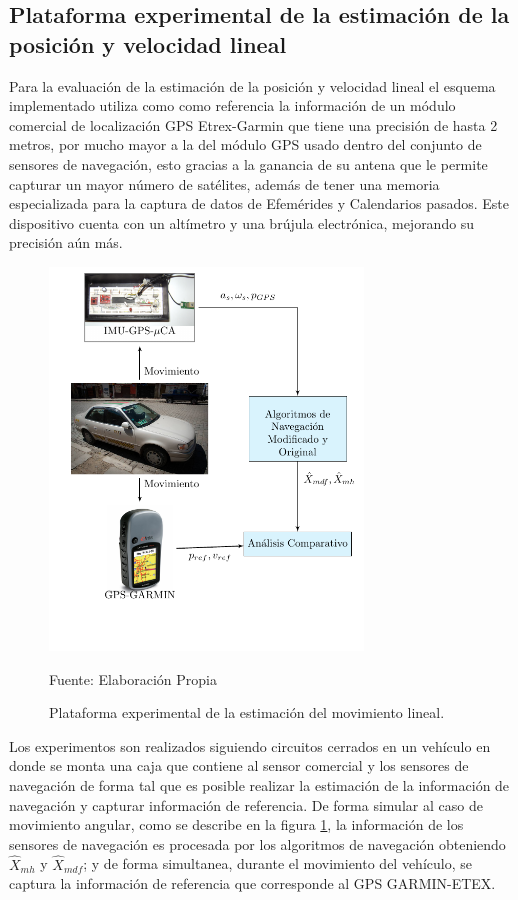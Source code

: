 \documentclass[conference]{IEEEtran}
\begin{document}
\subsection{Plataforma experimental de la estimación de la posición y velocidad lineal}
Para la evaluación de la estimación de la posición y velocidad lineal el esquema implementado utiliza como como referencia la información de un módulo comercial de localización GPS Etrex-Garmin que tiene una precisión de hasta 2 metros, por mucho mayor a la del módulo GPS usado dentro del conjunto de sensores de navegación, esto gracias a la ganancia de su antena que le permite capturar un mayor número de satélites, además de tener una memoria especializada para la captura de datos de Efemérides y Calendarios pasados. Este dispositivo cuenta con un altímetro y una brújula electrónica, mejorando su precisión aún más.\par%
\begin{figure}
\centering
\includegraphics[width=22.5em]{plataforma_fig14.pdf}
\caption{Plataforma experimental de la estimación del movimiento lineal.}
\scriptsize{Fuente: Elaboración Propia}
\label{plataforma_fig9}
\end{figure}
Los experimentos son realizados siguiendo circuitos cerrados en un vehículo en donde se monta una caja que contiene al sensor comercial y los sensores de navegación de forma tal que es posible realizar la estimación de la información de navegación y capturar información de referencia. De forma simular al caso de movimiento angular, como se describe en la figura \ref{plataforma_fig9}, la información de los sensores de navegación es procesada por los algoritmos de navegación obteniendo $\hat{X}_{mh}$ y $\hat{X}_{mdf}$; y de forma simultanea, durante el movimiento del vehículo, se captura la información de referencia que corresponde al GPS GARMIN-ETEX.
\end{document}
